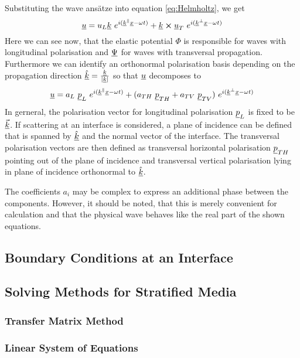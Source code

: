 Substituting the wave ansätze into equation \ref{eq:Helmholtz}, we get
\begin{equation}
    \uline{u} = u_L \uline{k}\	e^{i(\uline{k}^\Vert\uline{x}-\omega t)}
    + \uline{k} \cross \uline{u}_T\ e^{i(\uline{k}^\bot\uline{x}-\omega t)}
\end{equation}
Here we can see now, that the elastic potential $\Phi$ is responsible for waves
with longitudinal polarisation and $\underline{\Psi}$ for waves with transversal
propagation. Furthermore we can identify an orthonormal polarisation basis
depending on the propagation direction $\underline{\hat{k}} =
    \frac{\underline{k}}{|\underline{k}|}$ so that $\underline{u}$ decomposes to
\begin{equation}
    \uline{u} = a_L \ \uline{p}_L\	e^{i(\uline{k}^\Vert\uline{x}-\omega
            t)}
    + (a_{TH}\ \uline{p}_{TH} + a_{TV}\ \uline{p}_{TV})\
    e^{i(\uline{k}^\bot\uline{x}-\omega t)}
\end{equation}
In gerneral, the polarisation vector for longitudinal polarisation
$\underline{p}_L$ is fixed to be $\underline{\vec{k}}$. If scattering at an interface
is considered, a plane of incidence can be defined that is spanned by
$\underline{\hat{k}}$ and the normal vector of the interface. The transversal
polarisation vectors are then defined as transversal horizontal polarisation
$\underline{p}_{TH}$ pointing out of the plane of incidence and transversal
vertical polarisation lying in plane of incidence orthonormal to
$\underline{\hat{k}}$.

The coefficients $a_i$ may be complex to express an additional phase between
the components. However, it should be noted, that this is merely convenient for
calculation and that the physical wave behaves like the real part of the shown
equations.

\subsection{Boundary Conditions at an Interface}

\subsection{Solving Methods for Stratified Media}

\subsubsection{Transfer Matrix Method}

\subsubsection{Linear System of Equations}
